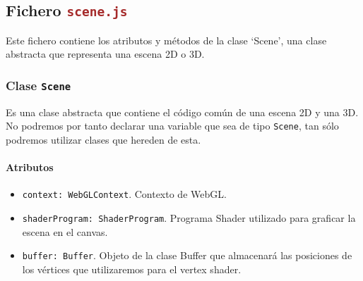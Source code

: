 \subsection{Fichero \Large\texttt{\textcolor{brown}{scene.js}}}

Este fichero contiene los atributos y métodos de la clase `Scene', una clase abstracta que representa una escena 2D o 3D.

\subsubsection{Clase \Large\texttt{\textcolor{Bittersweet}{Scene}}}
Es una clase abstracta que contiene el código común de una escena 2D y una 3D. No podremos por tanto declarar una variable que sea de tipo \verb|Scene|, tan sólo podremos utilizar clases que hereden de esta.

\paragraph*{Atributos}
\begin{itemize}
    \item \verb|context: WebGLContext|. Contexto de WebGL.
    \item \verb|shaderProgram: ShaderProgram|. Programa Shader utilizado para graficar la escena en el canvas.
    \item \verb|buffer: Buffer|. Objeto de la clase Buffer que almacenará las posiciones de los vértices que utilizaremos para el vertex shader.
\end{itemize}
